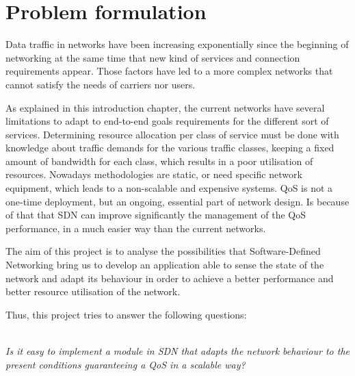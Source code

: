\section{Problem formulation}
\label{sec:problemformulation}

Data traffic in networks have been increasing exponentially since the beginning of networking at the same time that new kind of services and connection requirements appear. Those factors have led to a more complex networks that cannot satisfy the needs of carriers nor users.

As explained in this introduction chapter, the current networks have several limitations to adapt to end-to-end goals requirements for the different sort of services. Determining resource allocation per class of service must be done with knowledge about traffic demands for the various traffic classes, keeping a fixed amount of bandwidth for each class, which results in a poor utilisation of resources. Nowadays methodologies are static, or need specific network equipment, which leads to a non-scalable and expensive systems. QoS is not a one-time deployment, but an ongoing, essential part of network design. Is because of that that SDN can improve significantly the management of the QoS performance, in a much easier way than the current networks.

The aim of this project is to analyse the possibilities that Software-Defined Networking bring us to develop an application able to sense the state of the network and adapt its behaviour in order to achieve a better performance and better resource utilisation of the network.

Thus, this project tries to answer the following questions: 

\\

\emph{Is it easy to implement a module in SDN that adapts the network behaviour to the present conditions guaranteeing a QoS in a scalable way?}

